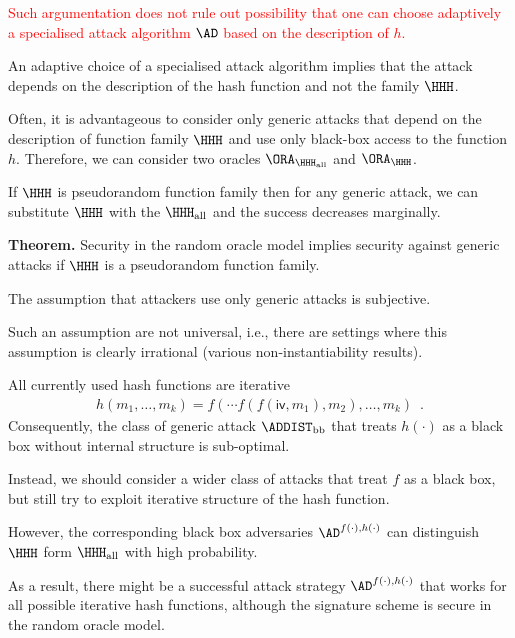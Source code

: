 \documentclass[landscape,footrule]{foils}
\newcommand{\HALL}{\HHH_{\mathrm{all}}}
\begin{document}
\textcolor{red}{Such argumentation does not rule out possibility that
  one can choose adaptively a specialised attack algorithm
  $\AD$ based on the description of $h$.}


An adaptive choice of a specialised attack algorithm implies that the
attack depends on the description of the hash function and not the family $\HHH$.

Often, it is advantageous to consider only generic attacks that depend
on the description of function family $\HHH$ and use only black-box
access to the function $h$. Therefore, we can consider two oracles
$\ORA_{\HALL}$ and $\ORA_{\HHH}$.

If $\HHH$ is pseudorandom function family then for any generic attack,
we can substitute $\HHH$ with the $\HALL$ and the success decreases marginally.

\textbf{Theorem.}  Security in the random oracle model implies
security against generic attacks if $\HHH$ is a pseudorandom function family.
\begin{triangles}
  \item The assumption that attackers use only generic attacks is subjective.
  \item Such an assumption are not universal, i.e., there are settings
    where this assumption is clearly irrational (various non-instantiability results).
\end{triangles}


All currently used hash functions are iterative
\begin{align*}
  h(m_1,\ldots,m_k)=f(\cdots f(f(\mathsf{iv},m_1),m_2),\ldots,m_k)\enspace.
\end{align*}
Consequently, the class of generic attack $\ADDIST_{\mathrm{bb}}$ that
treats $h(\cdot)$ as a black box without internal structure is
sub-optimal.

Instead, we should consider a wider class of attacks that treat $f$ as
a black box, but still try to exploit iterative structure of the hash
function.  

However, the corresponding black box adversaries
$\AD^{f(\cdot),h(\cdot)}$ can distinguish $\HHH$ form $\HALL$ with
high probability.

As a result, there might be a successful attack strategy
$\AD^{f(\cdot),h(\cdot)}$ that works for all possible iterative hash
functions, although the signature scheme is secure in the random
oracle model.
\end{document}
